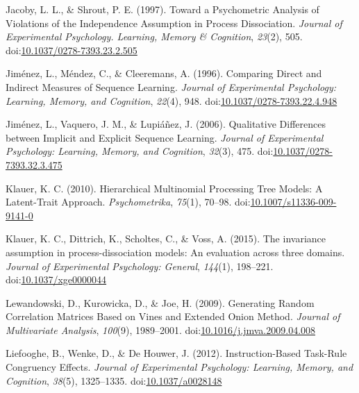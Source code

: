 \documentclass[floatsintext,man]{apa6}
\begin{document}
\hypertarget{ref-jacobyux5ftowardux5f1997}{}
Jacoby, L. L., \& Shrout, P. E. (1997). Toward a Psychometric Analysis
of Violations of the Independence Assumption in Process Dissociation.
\emph{Journal of Experimental Psychology. Learning, Memory \&
Cognition}, \emph{23}(2), 505.
doi:\href{https://doi.org/10.1037/0278-7393.23.2.505}{10.1037/0278-7393.23.2.505}

\hypertarget{ref-jimenezux5fcomparingux5f1996}{}
Jiménez, L., Méndez, C., \& Cleeremans, A. (1996). Comparing Direct and
Indirect Measures of Sequence Learning. \emph{Journal of Experimental
Psychology: Learning, Memory, and Cognition}, \emph{22}(4), 948.
doi:\href{https://doi.org/10.1037/0278-7393.22.4.948}{10.1037/0278-7393.22.4.948}

\hypertarget{ref-jimenezux5fqualitativeux5f2006}{}
Jiménez, L., Vaquero, J. M., \& Lupiáñez, J. (2006). Qualitative
Differences between Implicit and Explicit Sequence Learning.
\emph{Journal of Experimental Psychology: Learning, Memory, and
Cognition}, \emph{32}(3), 475.
doi:\href{https://doi.org/10.1037/0278-7393.32.3.475}{10.1037/0278-7393.32.3.475}

\hypertarget{ref-klauerux5fhierarchicalux5f2010}{}
Klauer, K. C. (2010). Hierarchical Multinomial Processing Tree Models: A
Latent-Trait Approach. \emph{Psychometrika}, \emph{75}(1), 70--98.
doi:\href{https://doi.org/10.1007/s11336-009-9141-0}{10.1007/s11336-009-9141-0}

\hypertarget{ref-klauerux5finvarianceux5f2015}{}
Klauer, K. C., Dittrich, K., Scholtes, C., \& Voss, A. (2015). The
invariance assumption in process-dissociation models: An evaluation
across three domains. \emph{Journal of Experimental Psychology:
General}, \emph{144}(1), 198--221.
doi:\href{https://doi.org/10.1037/xge0000044}{10.1037/xge0000044}

\hypertarget{ref-lewandowskiux5fgeneratingux5f2009}{}
Lewandowski, D., Kurowicka, D., \& Joe, H. (2009). Generating Random
Correlation Matrices Based on Vines and Extended Onion Method.
\emph{Journal of Multivariate Analysis}, \emph{100}(9), 1989--2001.
doi:\href{https://doi.org/10.1016/j.jmva.2009.04.008}{10.1016/j.jmva.2009.04.008}

\hypertarget{ref-liefoogheux5finstruction-basedux5f2012}{}
Liefooghe, B., Wenke, D., \& De Houwer, J. (2012). Instruction-Based
Task-Rule Congruency Effects. \emph{Journal of Experimental Psychology:
Learning, Memory, and Cognition}, \emph{38}(5), 1325--1335.
doi:\href{https://doi.org/10.1037/a0028148}{10.1037/a0028148}
\end{document}
